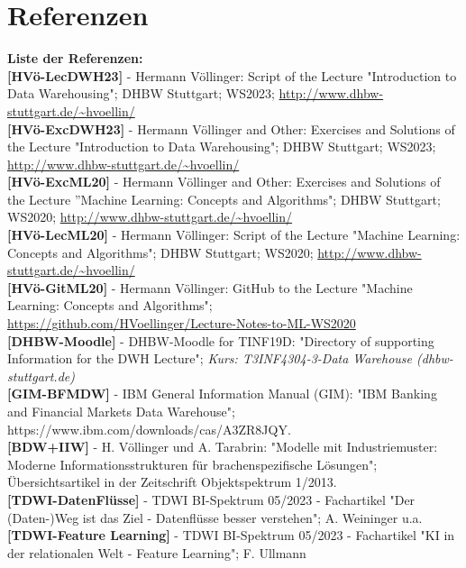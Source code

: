 \documentclass[12pt]{article}
\begin{document}
\newpage

 \section{Referenzen}

\textbf{Liste der Referenzen:} \\[0.3cm] 
%
\textbf{[HVö-LecDWH23]} - Hermann Völlinger: Script of the Lecture "Introduction to Data Warehousing"; DHBW Stuttgart; WS2023; \url{http://www.dhbw-stuttgart.de/~hvoellin/}\\[0.2cm] 
%
\textbf{[HVö-ExcDWH23]} - Hermann Völlinger and Other: Exercises and Solutions of the Lecture "Introduction to Data Warehousing"; DHBW Stuttgart; WS2023; \url{http://www.dhbw-stuttgart.de/~hvoellin/}\\[0.2cm] 
%
\textbf{[HVö-ExcML20]} - Hermann Völlinger and Other: Exercises and Solutions of the Lecture ”Machine Learning: Concepts and Algorithms"; DHBW Stuttgart; WS2020; \url{http://www.dhbw-stuttgart.de/~hvoellin/}\\[0.2cm] 
%
\textbf{[HVö-LecML20]} - Hermann Völlinger: Script of the Lecture "Machine Learning: Concepts and Algorithms"; DHBW Stuttgart; WS2020; \url{http://www.dhbw-stuttgart.de/~hvoellin/}\\[0.2cm]  
%
\textbf{[HVö-GitML20]} - Hermann Völlinger: GitHub to the Lecture "Machine Learning: Concepts and Algorithms";\\ 
\url{https://github.com/HVoellinger/Lecture-Notes-to-ML-WS2020}\\[0.2cm] 
%
\textbf{[DHBW-Moodle]} - DHBW-Moodle for TINF19D: "Directory of supporting Information for the DWH Lecture"; \textit{Kurs: T3INF4304-3-Data Warehouse (dhbw-stuttgart.de)}\\[0.2cm] 
%
\textbf{[GIM-BFMDW]} - IBM General Information Manual (GIM): "IBM Banking and Financial Markets Data Warehouse";  https://www.ibm.com/downloads/cas/A3ZR8JQY. \\[0.2cm] 
%
\textbf{[BDW+IIW]} - H. Völlinger und A. Tarabrin: "Modelle mit Industriemuster:
Moderne Informationsstrukturen für brachenspezifische Lösungen"; Übersichtsartikel in der Zeitschrift Objektspektrum 1/2013.\\[0.2cm] 
%
\textbf{[TDWI-DatenFlüsse]} - TDWI BI-Spektrum 05/2023 - Fachartikel "Der (Daten-)Weg ist das Ziel - Datenflüsse besser verstehen"; A. Weininger u.a.\\[0.2cm] 
%
\textbf{[TDWI-Feature Learning]} - TDWI BI-Spektrum  05/2023 - Fachartikel "KI in der relationalen Welt - Feature Learning"; F. Ullmann\\[0.2cm] 
\end{document}
